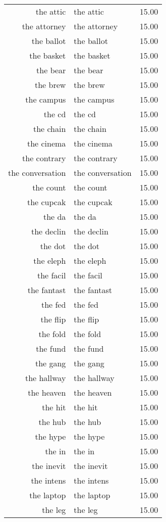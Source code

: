 \begin{table}[ht]
\begin{tabular}{rlr}
  the attic & the attic & 15.00 \\ 
  the attorney & the attorney & 15.00 \\ 
  the ballot & the ballot & 15.00 \\ 
  the basket & the basket & 15.00 \\ 
  the bear & the bear & 15.00 \\ 
  the brew & the brew & 15.00 \\ 
  the campus & the campus & 15.00 \\ 
  the cd & the cd & 15.00 \\ 
  the chain & the chain & 15.00 \\ 
  the cinema & the cinema & 15.00 \\ 
  the contrary & the contrary & 15.00 \\ 
  the conversation & the conversation & 15.00 \\ 
  the count & the count & 15.00 \\ 
  the cupcak & the cupcak & 15.00 \\ 
  the da & the da & 15.00 \\ 
  the declin & the declin & 15.00 \\ 
  the dot & the dot & 15.00 \\ 
  the eleph & the eleph & 15.00 \\ 
  the facil & the facil & 15.00 \\ 
  the fantast & the fantast & 15.00 \\ 
  the fed & the fed & 15.00 \\ 
  the flip & the flip & 15.00 \\ 
  the fold & the fold & 15.00 \\ 
  the fund & the fund & 15.00 \\ 
  the gang & the gang & 15.00 \\ 
  the hallway & the hallway & 15.00 \\ 
  the heaven & the heaven & 15.00 \\ 
  the hit & the hit & 15.00 \\ 
  the hub & the hub & 15.00 \\ 
  the hype & the hype & 15.00 \\ 
  the in & the in & 15.00 \\ 
  the inevit & the inevit & 15.00 \\ 
  the intens & the intens & 15.00 \\ 
  the laptop & the laptop & 15.00 \\ 
  the leg & the leg & 15.00 \\ 

\end{tabular}
\end{table}
